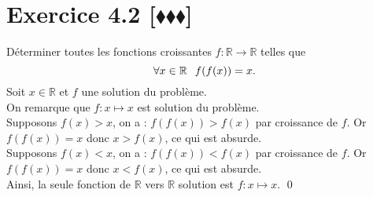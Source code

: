 \documentclass[10pt]{article}
\begin{document}
\section*{Exercice 4.2 [$\blacklozenge\blacklozenge\blacklozenge$]}
\begin{tcolorbox}[enhanced, width=7in, center, size=fbox, fontupper=\large, drop shadow southwest]
    Déterminer toutes les fonctions croissantes $f:\mathbb{R}\rightarrow\mathbb{R}$ telles que
    \begin{equation*}
        \forall{x\in\mathbb{R}} \hspace{0.25cm} f(f(x))=x.
    \end{equation*}
    Soit $x\in\mathbb{R}$ et $f$ une solution du problème.\\
    On remarque que $f:x\mapsto x$ est solution du problème.\\
    Supposons $f(x)>x$, on a : $f(f(x))>f(x)$ par croissance de $f$. Or $f(f(x))=x$ donc $x>f(x)$, ce qui est absurde.\\
    Supposons $f(x)<x$, on a : $f(f(x))<f(x)$ par croissance de $f$. Or $f(f(x))=x$ donc $x<f(x)$, ce qui est absurde.\\
    Ainsi, la seule fonction de $\mathbb{R}$ vers $\mathbb{R}$ solution est $f:x\mapsto x$. \qed
\end{tcolorbox}
\end{document}
